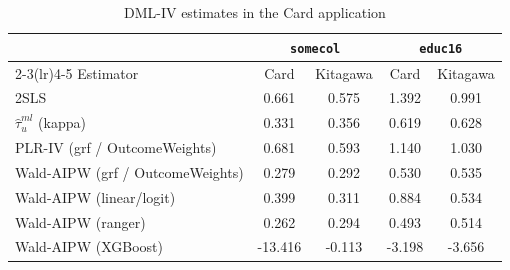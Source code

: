 \documentclass[12pt, a4paper, oneside]{article}
\theoremstyle{plain}
\theoremstyle{definition}
\begin{document}
\begin{table}[htbp]
\centering
\caption{DML-IV estimates in the Card application}
\label{tab:card_dml_estimates}
\begin{tabular}{lcccc}
\toprule
& \multicolumn{2}{c}{\texttt{somecol}} & \multicolumn{2}{c}{\texttt{educ16}} \\
\cmidrule(lr){2-3}\cmidrule(lr){4-5}
Estimator
& Card & Kitagawa
& Card & Kitagawa \\
\midrule
2SLS
& 0.661 & 0.575 & 1.392 & 0.991 \\

$\hat{\tau}^{ml}_{u}$ (kappa)
& 0.331 & 0.356 & 0.619 & 0.628 \\

PLR-IV (grf / OutcomeWeights)
& 0.681 & 0.593 & 1.140 & 1.030 \\

Wald-AIPW (grf / OutcomeWeights)
& 0.279 & 0.292 & 0.530 & 0.535 \\

Wald-AIPW (linear/logit)
& 0.399& 0.311 & 0.884 & 0.534  \\

Wald-AIPW (ranger)
& 0.262 & 0.294 & 0.493 & 0.514 \\

Wald-AIPW (XGBoost)
& -13.416 & -0.113 & -3.198 & -3.656 \\
\bottomrule
\end{tabular}
\end{table}
\end{document}
